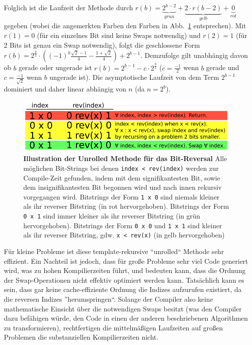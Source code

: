 \documentclass[10pt]{article}
\begin{document}
Folglich ist die Laufzeit der Methode durch $r(b) = \underbrace{2^{b-2}}_{gr\ddot un} + \underbrace{2 \cdot
r(b-2)}_{gelb} + \underbrace{0}_{rot}$ gegeben (wobei die angemerkten Farben den Farben in Abb.~\ref{figure:unrolled} entsprechen).
Mit $r(1) = 0$ (für ein einzelnes Bit sind keine Swaps notwendig) und $r(2) = 1$ (für 2 Bits ist genau ein Swap notwendig), folgt die 
geschlossene Form  $r(b) = 2^{\frac{b}{2}} \cdot \left( {(-1)}^b \frac{\sqrt{2}-1}{4} - \frac{1 +
  \sqrt{2}}{4} \right) + 2^{b-1}$. Demzufolge gilt unabhängig davon ob $b$ gerade oder ungerade ist
$r(b) = 2^{b-1} - c \cdot 2^{\frac{b}{2}}$ ($c=\frac{-1}{2}$ wenn $b$ gerade und $c=\frac{-1}{\sqrt{2}}$ wenn 
$b$ ungerade ist). Die asymptotische Laufzeit von dem Term $2^{b-1}$ dominiert und 
daher linear abhängig von $n$ (da $n=2^b$). 

\begin{figure}
\centering
\includegraphics[width=4.5in]{cartoons/unrolled.pdf}
\caption{{\bf Illustration der Unrolled Methode für das Bit-Reversal}
	Alle möglichen Bit-Strings bei denen {\tt index < rev(index)} werden zur Compile-Zeit gefunden, 
	indem mit dem signifikantesten Bit, sowie dem insignifikantesten Bit begonnen wird und nach innen rekursiv 
	vorgegangen wird. Bitstrings der Form {\tt 1~x~0} sind niemals kleiner als ihr reverser Bitstring (in rot hervorgehoben).
	Bitstrings der Form {\tt 0~x~1} sind immer kleiner als ihr reverser Bitstring (in grün hervorgehoben).
	Bitstrings der Form {\tt 0~x~0} und {\tt 1~x~1} sind kleiner als ihr reverser Bitstring, gdw. {\tt x < rev(x)}
	(in gelb hervorgehoben)	
  \label{figure:unrolled}}
\end{figure}

Für kleine Probleme ist diese template-rekursive ``unrolled`` Methode sehr effizient.
Ein Nachteil ist jedoch, dass für große Probleme sehr viel Code generiert wird, was zu hohen 
Kompilierzeiten führt, und bedeuten kann, dass die Ordnung der Swap-Operationen nicht effektiv 
optimiert werden kann. Tatsächlich kann es sein, dass gar keine cache-effiziente Ordnung die 
Indizes aufzurufen existiert, da die reversen Indizes ''herumspringen``. Solange der Compiler also keine 
mathematische Einsicht über die notwendigen Swaps besitzt (was den Compiler dazu befähigen würde, den Code in 
einen der anderen beschriebenen Algorithmen zu transformieren), rechtfertigen die 
mittelmäßigen Laufzeiten auf großen Problemen die substanziellen Kompilierzeiten nicht.
\end{document}
